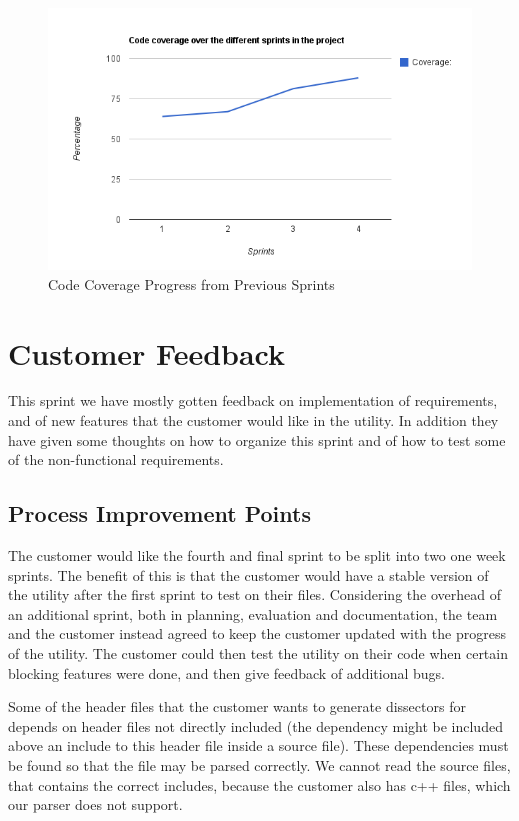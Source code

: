 \begin{figure}[htb]
	\center
	\includegraphics[width=\textwidth]{./sprints/img/sprint4_code_coverage_chart}
	\caption{Code Coverage Progress from Previous Sprints\label{fig:sp4CoverageChart}}
\end{figure}


\section{Customer Feedback}
\label{sec:sp4feedback}
This sprint we have mostly gotten feedback on implementation of requirements, and of new features that the customer would like in the utility. In addition they have given some thoughts on how to organize this sprint and of how to test some of the non-functional requirements.

\subsection{Process Improvement Points}
The customer would like the fourth and final sprint to be split into two one week sprints. The benefit of this is that the customer would have a stable version of the utility after the first sprint to test on their files. Considering the overhead of an additional sprint, both in planning, evaluation and documentation, the team and the customer instead agreed to keep the customer updated with the progress of the utility. The customer could then test the utility on their code when certain blocking features were done, and then give feedback of additional bugs.

Some of the header files that the customer wants to generate dissectors for depends on header files not directly included (the dependency might be included above an include to this header file inside a source file). These dependencies must be found so that the file may be parsed correctly. We cannot read the source files, that contains the correct includes, because the customer also has c++ files, which our parser does not support.


